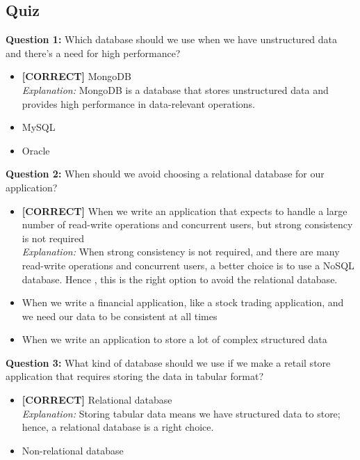 \subsection*{Quiz}
\vspace{0.3cm}
\noindent
\textbf{Question 1:} Which database should we use when we have unstructured data and there's a need for high performance?
\\[0.2cm]
\begin{itemize}
 \item \textbf{[CORRECT]} MongoDB
\\[0.1cm]
\textit{Explanation:} 
MongoDB is a database that stores unstructured data and provides high performance in data-relevant operations.
 \item MySQL
 \item Oracle
\end{itemize}
\vspace{0.3cm}
\noindent
\textbf{Question 2:} When should we avoid choosing a relational database for our application?
\\[0.2cm]
\begin{itemize}
 \item \textbf{[CORRECT]} When we write an application that expects to handle a large number of read-write operations and concurrent users, but strong consistency is not required
\\[0.1cm]
\textit{Explanation:} 
When strong consistency is not required, and there are many read-write operations and concurrent users, a better choice is to use a NoSQL database. Hence , this is the right option to avoid the relational database.
 \item When we write a financial application, like a stock trading application, and we need our data to be consistent at all times
 \item When we write an application to store a lot of complex structured data
\end{itemize}
\vspace{0.3cm}
\noindent
\textbf{Question 3:} What kind of database should we use if we make a retail store application that requires storing the data in tabular format?
\\[0.2cm]
\begin{itemize}
 \item \textbf{[CORRECT]} Relational database
\\[0.1cm]
\textit{Explanation:} 
Storing tabular data means we have structured data to store; hence, a relational database is a right choice.
 \item Non-relational database
\end{itemize}
